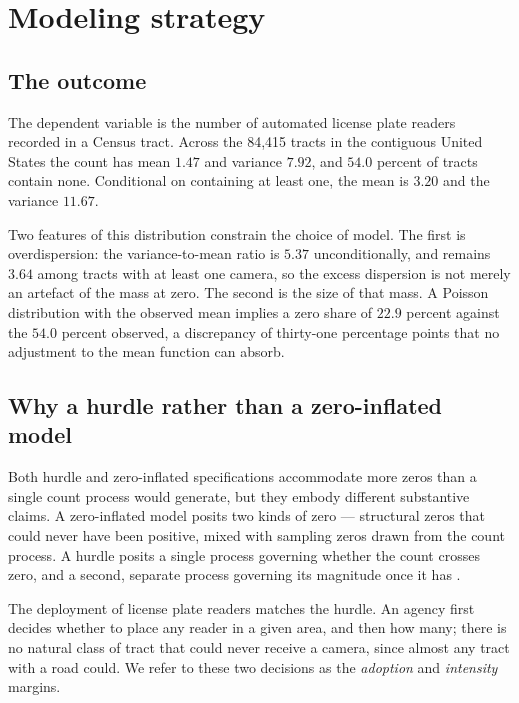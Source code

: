 
\section{Modeling strategy}

\subsection{The outcome}

The dependent variable is the number of automated license plate readers
recorded in a Census tract. Across the 84{,}415 tracts in the contiguous United
States the count has mean $1.47$ and variance $7.92$, and $54.0$ percent of
tracts contain none. Conditional on containing at least one, the mean is $3.20$
and the variance $11.67$.

Two features of this distribution constrain the choice of model. The first is
overdispersion: the variance-to-mean ratio is $5.37$ unconditionally, and
remains $3.64$ among tracts with at least one camera, so the excess dispersion
is not merely an artefact of the mass at zero. The second is the size of that
mass. A Poisson distribution with the observed mean implies a zero share of
$22.9$ percent against the $54.0$ percent observed, a discrepancy of thirty-one
percentage points that no adjustment to the mean function can absorb.

\subsection{Why a hurdle rather than a zero-inflated model}

Both hurdle and zero-inflated specifications accommodate more zeros than a
single count process would generate, but they embody different substantive
claims. A zero-inflated model posits two kinds of zero --- structural zeros
that could never have been positive, mixed with sampling zeros drawn from the
count process. A hurdle posits a single process governing whether the count
crosses zero, and a second, separate process governing its magnitude once it
has \citep{Mullahy1986}.

The deployment of license plate readers matches the hurdle. An agency first
decides whether to place any reader in a given area, and then how many; there
is no natural class of tract that could never receive a camera, since almost
any tract with a road could. We refer to these two decisions as the
\emph{adoption} and \emph{intensity} margins.

